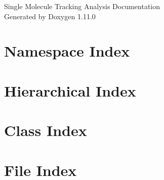 \documentclass[twoside]{book}
\newcommand{\+}{\discretionary{\mbox{\scriptsize$\hookleftarrow$}}{}{}}
\newcommand{\clearemptydoublepage}{%
    \newpage{\pagestyle{empty}\cleardoublepage}%
  }
\begin{document}
  \raggedbottom
    \hypersetup{pageanchor=false,
                bookmarksnumbered=true,
                pdfencoding=unicode
               }
  \begin{titlepage}
  \vspace*{7cm}
  \begin{center}%
  {\Large Single Molecule Tracking Analysis Documentation}\\
  \vspace*{1cm}
  {\large Generated by Doxygen 1.11.0}\\
  \end{center}
  \end{titlepage}
  \clearemptydoublepage
  \tableofcontents
  \clearemptydoublepage
  \hypersetup{pageanchor=true}
\chapter{Namespace Index}

\chapter{Hierarchical Index}

\chapter{Class Index}

\chapter{File Index}

\end{document}
